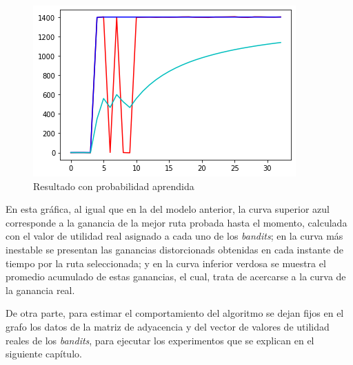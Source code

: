 \begin{figure} [H]
	\centering
	\includegraphics[scale=1]{Resul2}
	\caption{Resultado con probabilidad aprendida}
	\label{Resul2}
\end{figure}
En esta gráfica, al igual que en la del modelo anterior, la curva superior azul corresponde a la ganancia de la mejor ruta probada hasta el momento, calculada con el valor de utilidad real asignado a cada uno de los \textit{bandits}; en la curva más inestable se presentan las ganancias distorcionads obtenidas en cada instante de tiempo por la ruta seleccionada; y en la curva inferior verdosa se muestra el promedio acumulado de estas ganancias, el cual, trata de acercarse a la curva de la ganancia real. 

De otra parte, para estimar el comportamiento del algoritmo se dejan fijos en el grafo los datos de la matriz de adyacencia y del vector de valores de utilidad reales de los \textit{bandits}, para ejecutar los experimentos que se explican en el siguiente capítulo.


